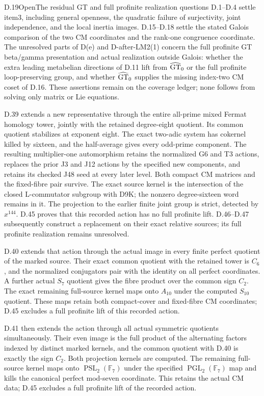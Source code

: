 \begin{statement}{D.19}{Open}{The residual GT and full profinite realization questions}
D.1--D.4 settle item3, including general openness, the quadratic failure of surjectivity, joint independence, and the local inertia images. D.15--D.18 settle the stated Galois comparison of the two CM coordinates and the rank-one congruence coordinate. The unresolved parts of D(e) and D-after-LM2(1) concern the full profinite GT beta/gamma presentation and actual realization outside Galois: whether the extra leading metabelian directions of D.11 lift from $\widehat{\rm GT}_0$ or the full profinite loop-preserving group, and whether $\widehat{\rm GT}_0$ supplies the missing index-two CM coset of D.16. These assertions remain on the coverage ledger; none follows from solving only matrix or Lie equations.

D.39 extends a new representative through the entire all-prime mixed Fermat homology tower, jointly with the retained degree-eight quotient. Its common quotient stabilizes at exponent eight. The exact two-adic system has cokernel killed by sixteen, and the half-average gives every odd-prime component. The resulting multiplier-one automorphism retains the normalized G6 and T3 actions, replaces the prior J3 and J12 actions by the specified new components, and retains its checked J48 seed at every later level. Both compact CM matrices and the fixed-fibre pair survive. The exact source kernel is the intersection of the closed L-commutator subgroup with D9K; the nonzero degree-sixteen word remains in it. The projection to the earlier finite joint group is strict, detected by $x^{144}$. D.45 proves that this recorded action has no full profinite lift. D.46--D.47 subsequently construct a replacement on their exact relative sources; its full profinite realization remains unresolved.

D.40 extends that action through the actual image in every finite
perfect quotient of the marked source. Their exact common quotient
with the retained tower is $C_6$, and the normalized conjugators pair
with the identity on all perfect coordinates. A further actual
$S_7$ quotient gives the fibre product over the common sign $C_2$.
The exact remaining full-source kernel maps onto $A_{10}$ under the
computed $S_{10}$ quotient. These maps retain both compact-cover and
fixed-fibre CM coordinates; D.45 excludes a full profinite lift of this recorded action.

D.41 then extends the action through all actual symmetric quotients
simultaneously. Their even image is the full product of the
alternating factors indexed by distinct marked kernels, and the
common quotient with D.40 is exactly the sign $C_2$.
Both projection kernels are computed. The remaining full-source
kernel maps onto $\operatorname{PSL}_2(\mathbb F_7)$ under the
specified $\operatorname{PGL}_2(\mathbb F_7)$ map and kills the
canonical perfect mod-seven coordinate. This retains the actual
CM data; D.45 excludes a full profinite lift of the recorded action.


\end{statement}
